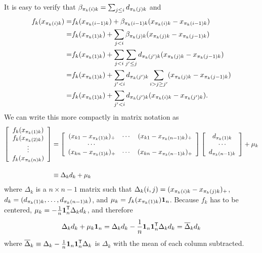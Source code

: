 It is easy to verify that $\beta_{\pi_k(i)k} = \sum_{j \leq i} d_{\pi_k(j)k}$ and 
\begin{align*}
f_k(x_{\pi_k(i)k}) = & f_k(x_{\pi_k(i-1)k}) + \beta_{\pi_k(i-1)k}(x_{\pi_k(i)k} - x_{\pi_k(i-1)k}) \\
 =& f_k(x_{\pi_k(1)k}) + \sum_{j < i} \beta_{\pi_k(j)k} (x_{\pi_k(j)k} - x_{\pi_k(j-1)k}) \\
 =& f_k(x_{\pi_k(1)k}) + \sum_{j < i} \sum_{j' \leq j} d_{\pi_k(j')k} (x_{\pi_k(j)k} - x_{\pi_k(j-1)k})\\
 =& f_k(x_{\pi_k(1)k}) + \sum_{j' < i} d_{\pi_k(j')k} \sum_{i > j \geq j'} (x_{\pi_k(j)k} - x_{\pi_k(j-1)k}) \\
 =& f_k(x_{\pi_k(1)k}) + \sum_{j' < i} d_{\pi_k(j')k} (x_{\pi_k(i)k} - x_{\pi_k(j')k}).
\end{align*}
We can write this more compactly in matrix notation as
\begin{align}
\nonumber
\left[ \begin{array}{c}
f_k(x_{\pi_k(1)k}) \\
f_k(x_{\pi_k(2)k}) \\
\vdots \\
f_k(x_{\pi_k(n)k})
\end{array} \right] &=
\left[ \begin{array}{ccc}
    (x_{k1} - x_{\pi_k(1)k})_+ & \cdots & (x_{k1} - x_{\pi_k(n-1)k})_+ \\
    \cdots & & \\
    (x_{kn} - x_{\pi_k(1)k})_+ & \cdots & (x_{kn} - x_{\pi_k(n-1)k})_+ 
\end{array} \right]
\left[ \begin{array}{c}
    d_{\pi_k(1)k} \\
    \cdots \\
    d_{\pi_k(n-1)k}
\end{array} \right] + \mu_k \\[10pt]
& \equiv \Delta_k d_k + \mu_k
\end{align}
where $\Delta_k$ is a $n\times n-1$ matrix such that $\Delta_k(i,j) =
(x_{\pi_k(i)k} - x_{\pi_k(j)k})_+$, $d_k = (d_{\pi_k(1)k} ,\ldots,
d_{\pi_k(n-1)k})$, and $\mu_k = f_k(x_{\pi_k(1)k}) \mbox{\boldmath $1$}_n$.
Because $f_k$ has to be centered, $\mu_k = - \frac{1}{n}
\mbox{\boldmath $1$}_n^{\mathsf{T}} \Delta_k d_k$, and therefore
\begin{equation}
\Delta_k d_k + \mu_k \mbox{\boldmath $1$}_n = 
   \Delta_k d_k - \frac{1}{n} \mbox{\boldmath $1$}_n \mbox{\boldmath $1$}_n^{\mathsf{T}} \Delta_k d_k = 
   \overline{\Delta}_k d_k 
\label{eq:deltabar_defn}
\end{equation}
where $\overline{\Delta}_k \equiv \Delta_k - \frac{1}{n} \mbox{\boldmath $1$}_n \mbox{\boldmath $1$}_n^{\mathsf{T}} \Delta_k$ is $\Delta_k$ with the mean of each column subtracted.

